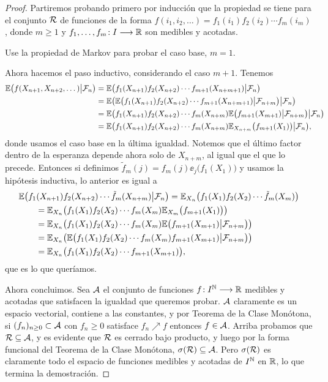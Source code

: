 \begin{proof}
Partiremos probando primero por inducción que la propiedad se tiene para el conjunto ${\cal R}$ de funciones de la forma $f(i_1,i_2,\dotsc)=f_1(i_1)f_2(i_2)\dotsm f_m(i_m)$, donde $m\geq1$ y $f_1,\dotsc,f_m\!:I\longrightarrow\mathbb{R}$ son medibles y acotadas.

\begin{exer}
Use la propiedad de Markov para probar el caso base, $m=1$.
\end{exer}

Ahora hacemos el paso inductivo, considerando el caso $m+1$.
Tenemos
\begin{align}
\ee\big(f(X_{n+1},X_{n+2},\dotsc)\big|\cf_n\big)&=\ee\big(f_1(X_{n+1})f_2(X_{n+2})\dotsm f_{m+1}(X_{n+m+1})\big|\cf_n\big)\\
&=\ee\big(\ee\big(f_1(X_{n+1})f_2(X_{n+2})\dotsm f_{m+1}(X_{n+m+1})\big|\cf_{n+m}\big)\big|\cf_n\big)\\
&=\ee\big(f_1(X_{n+1})f_2(X_{n+2})\dotsm f_{m}(X_{n+m})\ee\big(f_{m+1}(X_{m+1})\big|\cf_{n+m}\big)\big|\cf_n\big)\hskip-15pt\\
&=\ee\big(f_1(X_{n+1})f_2(X_{n+2})\dotsm f_{m}(X_{n+m})\ee_{X_{n+m}}\big(f_{m+1}(X_1)\big)\big|\cf_n\big),
\end{align}
donde usamos el caso base en la última igualdad.
Notemos que el último factor dentro de la esperanza depende ahora solo de $X_{n+m}$, al igual que el que lo precede.
Entonces si definimos $\tilde f_m(j)=f_m(j)\ee_{j}\big(f_1(X_1)\big)$ y usamos la hipótesis inductiva, lo anterior es igual a
\begin{align}
&\mathbb{E}\big(f_1(X_{n+1})f_2(X_{n+2})\dotsm \tilde f_{m}(X_{n+m})\big|\mathcal{F}_n\big)
=\mathbb{E}_{X_n}\big(f_1(X_{1})f_2(X_{2})\dotsm \tilde f_{m}(X_{m})\big)\\
&\qquad=\mathbb{E}_{X_n}\big(f_1(X_{1})f_2(X_{2})\dotsm f_{m}(X_{m})\mathbb{E}_{X_{m}}\big(f_{m+1}(X_1)\big)\big)\\
&\qquad=\mathbb{E}_{X_n}\big(f_1(X_{1})f_2(X_{2})\dotsm f_{m}(X_{m})\mathbb{E}\big(f_{m+1}(X_{m+1})\big|\mathcal{F}_{n+m}\big)\big)\\
&\qquad=\mathbb{E}_{X_n}\big(\mathbb{E}\big(f_1(X_{1})f_2(X_{2})\dotsm f_{m}(X_{m})f_{m+1}(X_{m+1})\big|\mathcal{F}_{n+m}\big)\big)\\
&\qquad=\mathbb{E}_{X_n}\big(f_1(X_{1})f_2(X_{2})\dotsm f_{m+1}(X_{m+1})\big),
\end{align}
que es lo que queríamos.

Ahora concluimos.
Sea ${\cal A}$ el conjunto de funciones $f\!:I^{\mathbb{N}}\longrightarrow\mathbb{R}$ medibles y acotadas que satisfacen la igualdad que queremos probar.
${\cal A}$ claramente es un espacio vectorial, contiene a las constantes, y por Teorema de la Clase Monótona, si $(f_n)_{n\geq0}\subset{\cal A}$ con $f_n\geq0$ satisface $f_n\nearrow f$ entonces $f\in{\cal A}$.
Arriba probamos que ${\cal R}\subseteq{\cal A}$, y es evidente que ${\cal R}$ es cerrado bajo producto, y luego por la forma funcional del Teorema de la Clase Monótona, $\sigma({\cal R})\subseteq{\cal A}$.
Pero $\sigma({\cal R})$ es claramente todo el espacio de funciones medibles y acotadas de $I^{\mathbb{N}}$ en $\mathbb{R}$, lo que termina la demostración.
\end{proof}

